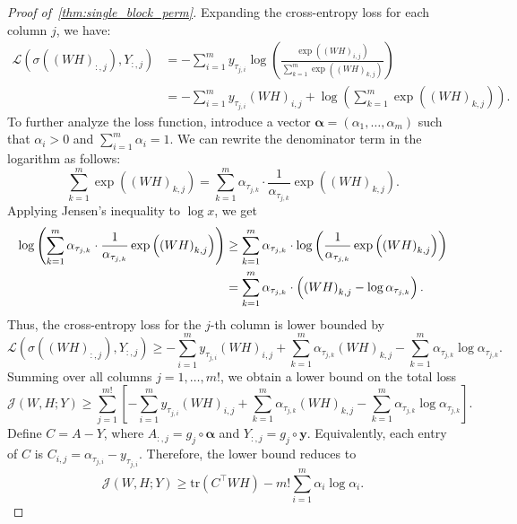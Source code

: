 \documentclass[11pt]{article}
\begin{document}
\begin{proof}[Proof of~\cref{thm:single_block_perm}]
Expanding the cross-entropy loss for each column \( j \), we have:
\begin{align*}
\mathcal L\left( \sigma\left( \left( W H \right)_{:,j}\right), Y_{:,j} \right ) &= - \sum_{i=1}^m y_{\tau_{j,i}} \log \left( \frac{ \exp\left( \left( W H \right)_{i,j} \right ) }{ \sum_{k=1}^m \exp\left( \left( W H \right)_{k,j} \right ) } \right )\\
& = - \sum_{i=1}^m y_{\tau_{j,i}} \left( W H \right)_{i,j} + \log \left( \sum_{k=1}^m \exp\left( \left( W H \right)_{k,j} \right ) \right ).
\end{align*}
To further analyze the loss function, introduce a vector \( \boldsymbol{\alpha}=(\alpha_1,\ldots,\alpha_m) \) such that \( \alpha_i > 0 \) and \( \sum_{i=1}^m \alpha_i = 1 \). We can rewrite the denominator term in the logarithm as follows:
\[
\sum_{k=1}^m \exp\left( \left( W H \right)_{k,j} \right ) = \sum_{k=1}^m \alpha_{\tau_{j,k}} \cdot \frac{1}{\alpha_{\tau_{j,k}}} \exp\left( \left( W H \right)_{k,j} \right ).
\]
Applying Jensen's inequality to \( \log x \), we get
\begin{align}
\label{eq:jensen}
\log \left( \sum_{k=1}^m \alpha_{\tau_{j,k}} \cdot \frac{1}{\alpha_{\tau_{j,k}}} \exp\left( \left( W H \right)_{k,j} \right ) \right ) &\ge \sum_{k=1}^m \alpha_{\tau_{j,k}} \cdot \log \left( \frac{1}{\alpha_{\tau_{j,k}}} \exp\left( \left( W H \right)_{k,j} \right ) \right )\\
&= \sum_{k=1}^m \alpha_{\tau_{j,k}} \cdot \left( \left( W H \right)_{k,j} - \log \alpha_{\tau_{j,k}} \right ).  \notag
\end{align}
Thus, the cross-entropy loss for the \( j \)-th column is lower bounded by
\[
\mathcal L\left( \sigma\left( \left( W H \right)_{:,j}\right), Y_{:,j} \right ) \ge - \sum_{i=1}^m y_{\tau_{j,i}} \left( W H \right)_{i,j} + \sum_{k=1}^m \alpha_{\tau_{j,k}} \left( W H \right)_{k,j} - \sum_{k=1}^m \alpha_{\tau_{j,k}} \log \alpha_{\tau_{j,k}}.
\]
Summing over all columns \( j = 1, \ldots, m! \), we obtain a lower bound on the total loss
\[
\mathcal J(W,H;Y)
\ge
\sum_{j=1}^{m!}
\left[
- \sum_{i=1}^m y_{\tau_{j,i}} \left( W H \right)_{i,j}
+ \sum_{k=1}^m \alpha_{\tau_{j,k}} \left( W H \right)_{k,j}
- \sum_{k=1}^m \alpha_{\tau_{j,k}} \log \alpha_{\tau_{j,k}}
\right].
\]
Define \( C = A - Y \), where \( A_{:,j}=g_j\circ\boldsymbol{\alpha} \) and \( Y_{:,j}=g_j\circ\boldsymbol{y} \). Equivalently, each entry of \( C \) is \( C_{i,j} = \alpha_{\tau_{j,i}} - y_{\tau_{j,i}} \). 
Therefore, the lower bound reduces to
\[
\mathcal J(W,H;Y) \ge \mathrm{tr}\left( C^\top W H \right ) - m!\sum_{i=1}^m\alpha_i\log\alpha_i.
\]


\end{proof}
\end{document}
